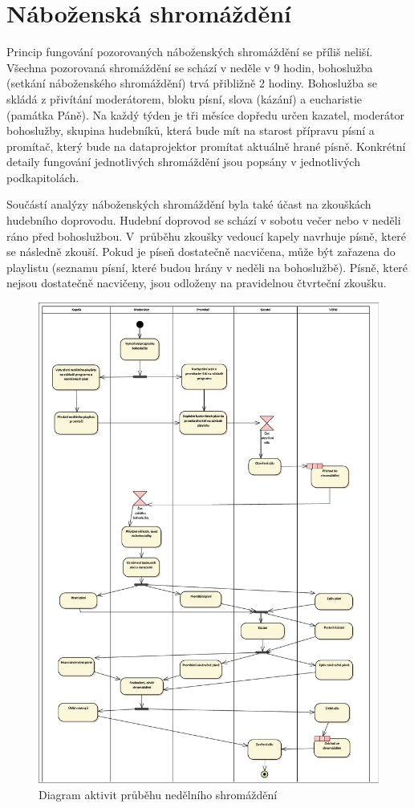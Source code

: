\section{Náboženská shromáždění}

Princip fungování pozorovaných náboženských shromáždění se příliš neliší. Všechna pozorovaná shromáždění se schází v neděle v 9 hodin, bohoslužba (setkání náboženského shromáždění) trvá přibližně 2 hodiny. Bohoslužba se skládá z přivítání moderátorem, bloku písní, slova (kázání) a eucharistie (památka Páně). Na každý týden je tři měsíce dopředu určen kazatel, moderátor bohoslužby, skupina hudebníků, která bude mít na starost přípravu písní a promítač, který bude na dataprojektor promítat aktuálně hrané písně. Konkrétní detaily fungování jednotlivých shromáždění jsou popsány v jednotlivých podkapitolách.

Součástí analýzy náboženských shromáždění byla také účast na zkouškách hudebního doprovodu. Hudební doprovod se schází v sobotu večer nebo v neděli ráno před bohoslužbou. V~průběhu zkoušky vedoucí kapely navrhuje písně, které se následně zkouší. Pokud je píseň dostatečně nacvičena, může být zařazena do playlistu (seznamu písní, které budou hrány v neděli na bohoslužbě). Písně, které nejsou dostatečně nacvičeny, jsou odloženy na pravidelnou čtvrteční zkoušku.

\begin{figure}
    \includegraphics[width=\textwidth]{images/2-analyza/2-1-nedelni-shromazdeni.pdf}
    \caption{Diagram aktivit průběhu nedělního shromáždění}
\end{figure}

